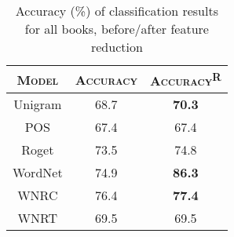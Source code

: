 \begin{table}[!t]
    \caption{Accuracy (\%) of classification results for all books, before/after feature reduction}
    \label{tab:results all}
    \begin{tabular}{c|c|c}
        \centering
        \textsc{Model} & \textsc{Accuracy} & \textsc{Accuracy\textsuperscript{R}} \\
        \hline
        Unigram & 68.7 & \textbf{70.3} \\
        \hline
        POS & 67.4%
        & 67.4%
        \\
        \hline
        Roget & 73.5 & 74.8 \\
        \hline
        WordNet & 74.9 & \textbf{86.3} \\
        \hline
        WNRC & 76.4 & \textbf{77.4} \\
        \hline
        WNRT & 69.5 & 69.5 \\
        \hline
    \end{tabular}
\end{table}